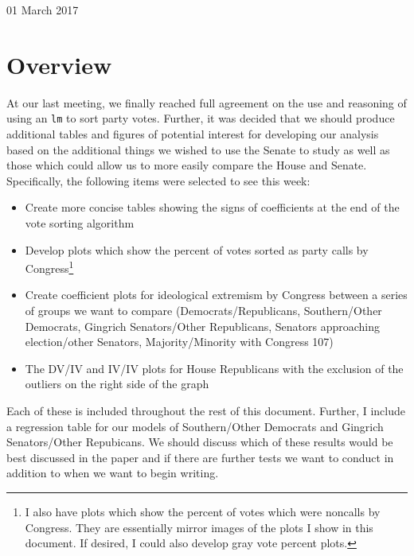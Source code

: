 \documentclass[12pt]{article}
\begin{document}
	
\begin{center}
	\Large 01 March 2017
\end{center}

\section{Overview}

At our last meeting, we finally reached full agreement on the use and reasoning of using an \verb|lm| to sort party votes. Further, it was decided that we should produce additional tables and figures of potential interest for developing our analysis based on the additional things we wished to use the Senate to study as well as those which could allow us to more easily compare the House and Senate. Specifically, the following items were selected to see this week:

\begin{itemize}
	\item Create more concise tables showing the signs of coefficients at the end of the vote sorting algorithm
	
	\item Develop plots which show the percent of votes sorted as party calls by Congress\footnote{I also have plots which show the percent of votes which were noncalls by Congress. They are essentially mirror images of the plots I show in this document. If desired, I could also develop gray vote percent plots.}
	
	\item Create coefficient plots for ideological extremism by Congress between a series of groups we want to compare (Democrats/Republicans, Southern/Other Democrats, Gingrich Senators/Other Republicans, Senators approaching election/other Senators, Majority/Minority with Congress 107)
	
	\item The DV/IV and IV/IV plots for House Republicans with the exclusion of the outliers on the right side of the graph
\end{itemize}

\noindent
Each of these is included throughout the rest of this document. Further, I include a regression table for our models of Southern/Other Democrats and Gingrich Senators/Other Repubicans. We should discuss which of these results would be best discussed in the paper and if there are further tests we want to conduct in addition to when we want to begin writing.

\clearpage	
\end{document}

